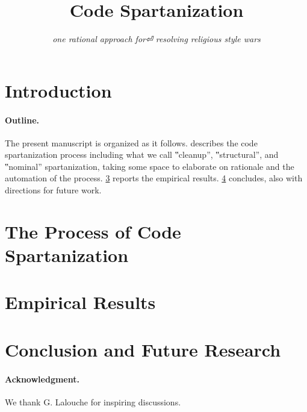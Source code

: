 \documentclass[preprint,10pt,nonatbib]{sigplanconf}
\title{Code Spartanization}
\subtitle{\scriptsize \emph{one rational approach for⏎ resolving religious style wars}}
\begin{document}
\maketitle

\def\ignore#1{}
\def\yossi{\marginpar[Y$⇒$]{$⇐$Y}}
\def\matteo{\marginpar[M$⇒$]{$⇐$M}}

\begin{abstract}
  
\end{abstract}

\section{Introduction}


\paragraph{Outline.} The present manuscript is organized as it follows. 
 describes the code spartanization
process including what we call ‟cleanup”, ‟structural”, and ‟nominal”
spartanization, taking some space to elaborate on rationale and the automation
of the process. \cref{section:empirical} reports the empirical results.
\cref{section:zz} concludes, also with directions for future work. 

\section{The Process of Code Spartanization}
\label{section:process}


\section{Empirical Results}
\label{section:empirical}


\section{Conclusion and Future Research}
\label{section:zz}


\paragraph{Acknowledgment.} We thank G. Lalouche for inspiring discussions.

\balance
\small

\end{document}
